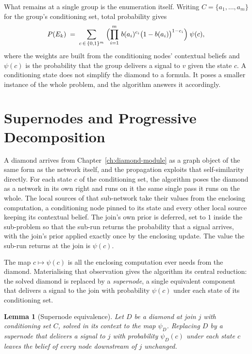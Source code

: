 \documentclass[12pt]{report}
\newtheorem{lemma}[theorem]{Lemma}
\begin{document}
What remains at a single group is the enumeration itself. Writing $C = \{a_1, \dots, a_m\}$ for the group's conditioning set, total probability gives
\begin{equation}
\label{eq:pp-enumeration}
P(E_k) \;=\; \sum_{c \,\in\, \{0,1\}^{m}} \; \Bigl( \prod_{i=1}^{m} \, b(a_i)^{c_i} \bigl(1 - b(a_i)\bigr)^{1 - c_i} \Bigr) \; \psi(c),
\end{equation}
where the weights are built from the conditioning nodes' contextual beliefs and $\psi(c)$ is the probability that the group delivers a signal to $v$ given the state $c$. A conditioning state does not simplify the diamond to a formula. It poses a smaller instance of the whole problem, and the algorithm answers it accordingly.

\section{Supernodes and Progressive Decomposition}
\label{sec:pp-supernodes}

A diamond arrives from Chapter~\ref{ch:diamond-module} as a graph object of the same form as the network itself, and the propagation exploits that self-similarity directly. For each state $c$ of the conditioning set, the algorithm poses the diamond as a network in its own right and runs on it the same single pass it runs on the whole. The local sources of that sub-network take their values from the enclosing computation, a conditioning node pinned to its state and every other local source keeping its contextual belief. The join's own prior is deferred, set to $1$ inside the sub-problem so that the sub-run returns the probability that a signal arrives, with the join's prior applied exactly once by the enclosing update. The value the sub-run returns at the join is $\psi(c)$.

The map $c \mapsto \psi(c)$ is all the enclosing computation ever needs from the diamond. Materialising that observation gives the algorithm its central reduction: the solved diamond is replaced by a \emph{supernode}, a single equivalent component that delivers a signal to the join with probability $\psi(c)$ under each state of its conditioning set.

\begin{lemma}[Supernode equivalence]
\label{lem:pp-supernode}
Let $D$ be a diamond at join $j$ with conditioning set $C$, solved in its context to the map $\psi_D$. Replacing $D$ by a supernode that delivers a signal to $j$ with probability $\psi_D(c)$ under each state $c$ leaves the belief of every node downstream of $j$ unchanged.
\end{lemma}
\end{document}
